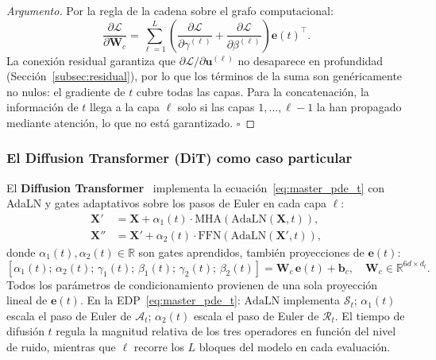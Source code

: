 \begin{proof}[Argumento]
Por la regla de la cadena sobre el grafo computacional:
\[
  \frac{\partial\mathcal{L}}{\partial\bm{W}_c}
  = \sum_{\ell=1}^L\!\left(
    \frac{\partial\mathcal{L}}{\partial\gamma^{(\ell)}}
    + \frac{\partial\mathcal{L}}{\partial\beta^{(\ell)}}\right)
    \bm{e}(t)^\top.
\]
La conexión residual garantiza que
$\partial\mathcal{L}/\partial\bm{u}^{(\ell)}$ no desaparece en
profundidad (Sección~\ref{subsec:residual}), por lo que los
términos de la suma son genéricamente no nulos: el gradiente de
$t$ cubre todas las capas. Para la concatenación, la información
de $t$ llega a la capa $\ell$ solo si las capas $1,\ldots,\ell-1$
la han propagado mediante atención, lo que no está garantizado.
$\square$
\end{proof}

\subsubsection*{El Diffusion Transformer (DiT) como caso particular}

El \textbf{Diffusion Transformer}~\cite{peebles2023dit} implementa
la ecuación~\eqref{eq:master_pde_t} con AdaLN y gates adaptativos
sobre los pasos de Euler en cada capa $\ell$:
\begin{align}
  \bm{X}' &= \bm{X}
    + \alpha_1(t)\cdot
      \mathrm{MHA}\!\left(\mathrm{AdaLN}(\bm{X},t)\right),
    \label{eq:dit_a}\\
  \bm{X}'' &= \bm{X}'
    + \alpha_2(t)\cdot
      \mathrm{FFN}\!\left(\mathrm{AdaLN}(\bm{X}',t)\right),
    \label{eq:dit_b}
\end{align}
donde $\alpha_1(t), \alpha_2(t) \in \mathbb{R}$ son gates
aprendidos, también proyecciones de $\bm{e}(t)$:
\[
  [\alpha_1(t);\,\alpha_2(t);\,
   \gamma_1(t);\,\beta_1(t);\,
   \gamma_2(t);\,\beta_2(t)]
  = \bm{W}_c\,\bm{e}(t) + \bm{b}_c,
  \quad \bm{W}_c \in \mathbb{R}^{6d \times d_t}.
\]
Todos los parámetros de condicionamiento provienen de una sola
proyección lineal de $\bm{e}(t)$. En la EDP~\eqref{eq:master_pde_t}:
$\mathrm{AdaLN}$ implementa $\mathcal{S}_t$; $\alpha_1(t)$ escala
el paso de Euler de $\mathcal{A}_t$; $\alpha_2(t)$ escala el paso
de Euler de $\mathcal{R}_t$. El tiempo de difusión $t$ regula la
magnitud relativa de los tres operadores en función del nivel de
ruido, mientras que $\ell$ recorre los $L$ bloques del modelo en
cada evaluación.

